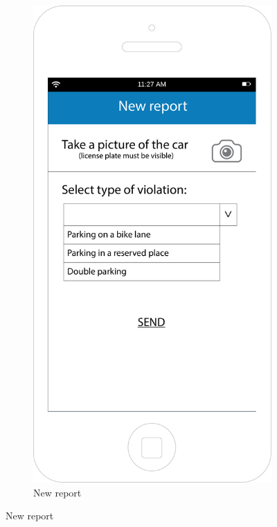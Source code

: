 \documentclass[12pt,a4paper]{report}
\begin{document}
\begin{figure}
\begin{subfigure}{0.5\textwidth}
		\end{subfigure}
		\begin{subfigure}{0.5\textwidth}
			\includegraphics[scale=0.25, center]{Newreport}
			\caption{New report}
			\label{fig:subim2}
		\end{subfigure}
		\end{figure}
\end{document}
